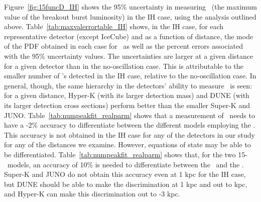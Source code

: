 Figure~\ref{fig:15funcD_IH} shows the 95\% uncertainty
in measuring \lmax\ (the maximum value of the breakout burst
luminosity) in the IH case, using the analysis outlined above.
Table~\ref{tab:maxvalerrortable_IH}  shows, in the IH case, for each
representative detector (except IceCube) and as a function of
distance, the mode of the PDF obtained in each case for \lmax\ as well
as the percent errors associated with the 95\% uncertainty values.
The uncertainties are larger
at a given distance for a given detector than in the no-oscillation 
case.    This is attributable to the
smaller number of \nue's detected in the IH case, 
relative to the no-oscillation case.  
In general, though, the same hierarchy in the detectors'
ability to measure \lmax\ is seen:  for a given distance, 
Hyper-K (with its larger detection mass) and DUNE (with its larger
detection cross sections)
perform better than the smaller Super-K and
JUNO.
Table~\ref{tab:numpeakfit_realparm} shows that a measurement of \lmax\
needs to have a -2\% accuracy to differentiate between the
different models employing the \ls.  This accuracy is not obtained in
the IH case for
any of the detectors in our study for any of the distances we
examine.  However, equations of state may be able to be
differentiated.  Table~\ref{tab:numpeakfit_realparm} shows that, for
the two 15-\Msol\ models, an accuracy of 10\% is needed to
differentiate between the \ls\ and the \shen.  
Super-K and JUNO do not
obtain this accuracy even at 1 kpc for the IH case, 
but DUNE should be able to make
the discrimination at 1 kpc and out to  kpc, and
Hyper-K can make this discrimination out to \abt 2-3 kpc.

